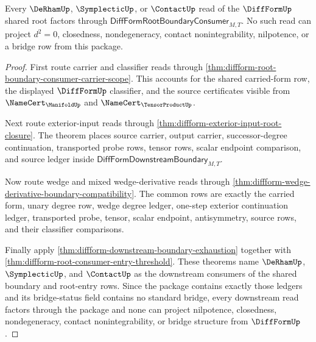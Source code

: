 \begin{theorem}
\label{thm:diffform-root-boundary-consumer-exactness}
Every $\DeRhamUp$, $\SymplecticUp$, or $\ContactUp$ read of the
$\DiffFormUp$ shared root factors through
$\mathsf{DiffFormRootBoundaryConsumer}_{M,T}$. No such read can project
$d^2=0$, closedness, nondegeneracy, contact nonintegrability, nilpotence, or
a bridge row from this package.
\end{theorem}
\begin{proof}
First route carrier and classifier reads through
\autoref{thm:diffform-root-boundary-consumer-carrier-scope}. This accounts
for the shared carried-form row, the displayed $\DiffFormUp$ classifier, and
the source certificates visible from $\NameCert_{\ManifoldUp}$ and
$\NameCert_{\TensorProductUp}$.

Next route exterior-input reads through
\autoref{thm:diffform-exterior-input-root-closure}. The theorem places source
carrier, output carrier, successor-degree continuation, transported probe
rows, tensor rows, scalar endpoint comparison, and source ledger inside
$\mathsf{DiffFormDownstreamBoundary}_{M,T}$.

Now route wedge and mixed wedge-derivative reads through
\autoref{thm:diffform-wedge-derivative-boundary-compatibility}. The common
rows are exactly the carried form, unary degree row, wedge degree ledger,
one-step exterior continuation ledger, transported probe, tensor, scalar
endpoint, antisymmetry, source rows, and their classifier comparisons.

Finally apply \autoref{thm:diffform-downstream-boundary-exhaustion} together
with \autoref{thm:diffform-root-consumer-entry-threshold}. These theorems
name $\DeRhamUp$, $\SymplecticUp$, and $\ContactUp$ as the downstream
consumers of the shared boundary and root-entry rows. Since the package
contains exactly those ledgers and its bridge-status field contains no
standard bridge, every downstream read factors through the package and none
can project nilpotence, closedness, nondegeneracy, contact nonintegrability,
or bridge structure from $\DiffFormUp$.
\end{proof}
